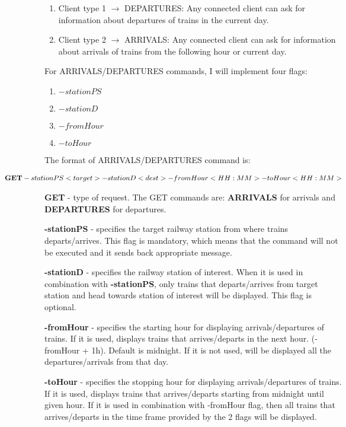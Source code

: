 \documentclass[runningheads]{llncs}
\begin{document}
\begin{enumerate}
    \item Client type 1 $\rightarrow$ DEPARTURES: Any connected client can ask for information about departures of trains in the current day.
    \item Client type 2 $\rightarrow$ ARRIVALS: Any connected client can ask for information about arrivals of trains from the following hour or current day.
\end{enumerate}

 For ARRIVALS/DEPARTURES commands, I will implement four flags: 
 \begin{enumerate}
        \item $-stationPS$
        \item $-stationD$
        \item $-fromHour$
        \item $-toHour$
 \end{enumerate}

The format of ARRIVALS/DEPARTURES command is:

\begin{gather*}
   \hspace*{-2cm}\textbf{GET} -stationPS <target> -stationD <dest> -fromHour <HH:MM> -toHour <HH:MM>
\end{gather*}

 \textbf{GET} - type of request. The GET commands are: \textbf{ARRIVALS} for arrivals and \textbf{DEPARTURES} for departures.
 
\textbf{-stationPS} - specifies the target railway station from where trains departs/arrives. This flag is mandatory, which means that the command will not be executed and it sends back appropriate message.

\textbf{-stationD} - specifies the railway station of interest. When it is used in combination with \textbf{-stationPS}, only trains that departs/arrives from target station and head towards station of interest will be displayed. This flag is optional.

\textbf{-fromHour} - specifies the starting hour for displaying arrivals/departures of trains. If it is used, displays trains that arrives/departs in the next hour. (-fromHour + 1h). Default is midnight. If it is not used, will be displayed all the departures/arrivals from that day.

\textbf{-toHour} - specifies the stopping hour for displaying arrivals/departures of trains. If it is used, displays trains that arrives/departs starting from midnight until given hour. If it is used in combination with -fromHour flag, then all trains that arrives/departs in the time frame provided by the 2 flags will be displayed.
\end{document}
